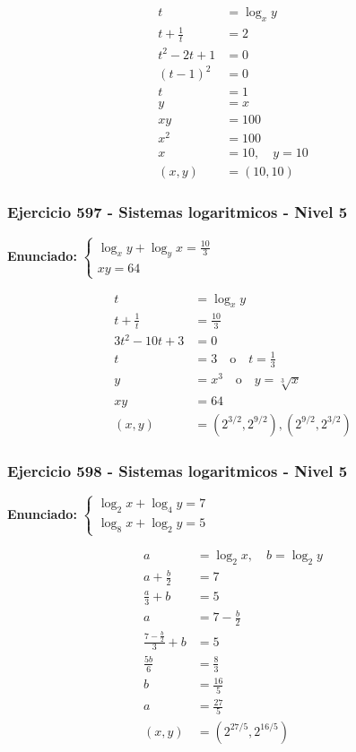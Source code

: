 \documentclass[12pt,a4paper]{article}
\begin{document}
\[
\begin{aligned}
t&=\log_xy\\
t+\frac1t&=2\\
t^2-2t+1&=0\\
(t-1)^2&=0\\
t&=1\\
y&=x\\
xy&=100\\
x^2&=100\\
x&=10,
\quad y=10\\
(x,y)&=\boxed{(10,10)}
\end{aligned}
\]


\subsubsection*{Ejercicio 597 - Sistemas logaritmicos - Nivel 5}
\textbf{Enunciado:} \(\begin{cases}\log_xy+\log_yx=\frac{10}{3}\\ xy=64\end{cases}\)

\[
\begin{aligned}
t&=\log_xy\\
t+\frac1t&=\frac{10}{3}\\
3t^2-10t+3&=0\\
t&=3\quad \text{o}\quad t=\frac13\\
y&=x^3\quad \text{o}\quad y=\sqrt[3]{x}\\
xy&=64\\
(x,y)&=\boxed{\left(2^{3/2},2^{9/2}\right),\left(2^{9/2},2^{3/2}\right)}
\end{aligned}
\]


\subsubsection*{Ejercicio 598 - Sistemas logaritmicos - Nivel 5}
\textbf{Enunciado:} \(\begin{cases}\log_2x+\log_4y=7\\ \log_8x+\log_2y=5\end{cases}\)

\[
\begin{aligned}
a&=\log_2x,
\quad b=\log_2y\\
a+\frac b2&=7\\
\frac a3+b&=5\\
a&=7-\frac b2\\
\frac{7-\frac b2}{3}+b&=5\\
\frac{5b}{6}&=\frac83\\
b&=\frac{16}{5}\\
a&=\frac{27}{5}\\
(x,y)&=\boxed{\left(2^{27/5},2^{16/5}\right)}
\end{aligned}
\]
\end{document}
